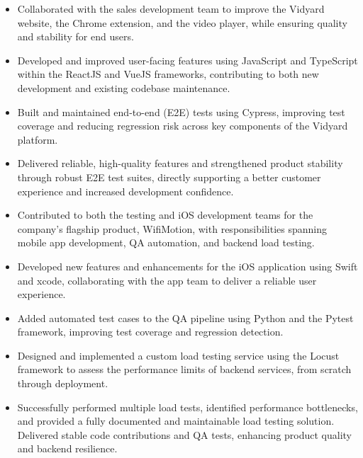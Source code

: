 \documentclass[10pt,a4paper]{altacv}
\begin{document}
\begin{itemize}
    \item Collaborated with the sales development team to improve the Vidyard website, the Chrome extension, and the video player, while ensuring quality and stability for end users.
    \item Developed and improved user-facing features using JavaScript and TypeScript within the ReactJS and VueJS frameworks, contributing to both new development and existing codebase maintenance.
    \item Built and maintained end-to-end (E2E) tests using Cypress, improving test coverage and reducing regression risk across key components of the Vidyard platform.
    \item Delivered reliable, high-quality features and strengthened product stability through robust E2E test suites, directly supporting a better customer experience and increased development confidence.
\end{itemize}

\divider

\begin{itemize}
    \item Contributed to both the testing and iOS development teams for the company's flagship product, WifiMotion, with responsibilities spanning mobile app development, QA automation, and backend load testing.
    \item Developed new features and enhancements for the iOS application using Swift and xcode, collaborating with the app team to deliver a reliable user experience.
    \item Added automated test cases to the QA pipeline using Python and the Pytest framework, improving test coverage and regression detection.
    \item Designed and implemented a custom load testing service using the Locust framework to assess the performance limits of backend services, from scratch through deployment.
    \item Successfully performed multiple load tests, identified performance bottlenecks, and provided a fully documented and maintainable load testing solution. Delivered stable code contributions and QA tests, enhancing product quality and backend resilience.
\end{itemize}
\end{document}
